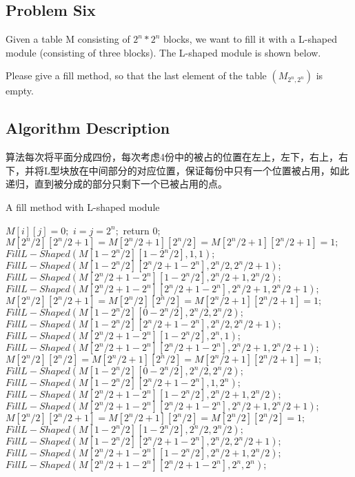 \documentclass{article}
\begin{document}
\begin{CJK*}{UTF8}{gbsn}
\newpage
\section{Problem Six}
Given a table M consisting of $2^n * 2^n$ blocks, we want to fill it with a L-shaped module (consisting of three blocks). The L-shaped module is shown below.

Please give a fill method, so that the last element of the table $(M_{2^n,2^n})$ is empty.

\subsection{Algorithm Description}
算法每次将平面分成四份，每次考虑4份中的被占的位置在左上，左下，右上，右下，并将L型块放在中间部分的对应位置，保证每份中只有一个位置被占用，如此递归，直到被分成的部分只剩下一个已被占用的点。

\begin{algorithm}[htbp]  
  \caption{A fill method with L-shaped module}  
  \begin{algorithmic}[1] 
	\State $M[i][j] = 0;$
	\EndFor
	\EndFor
	\State $i = j = 2^n;$
	\State return 0;
	\EndIf
	\State $M[2^n/2][2^n/2+1]= M[2^n/2+1][2^n/2]= M[2^n/2+1][2^n/2+1] =1;$
	\State $FillL-Shaped(M[1-2^n/2][1-2^n/2], 1, 1);$
	\State $FillL-Shaped(M[1-2^n/2][2^n/2+1-2^n], 2^n/2, 2^n/2+1);$
	\State $FillL-Shaped(M[2^n/2+1-2^n][1-2^n/2], 2^n/2+1, 2^n/2);$
	\State $FillL-Shaped(M[2^n/2+1-2^n][2^n/2+1-2^n], 2^n/2+1, 2^n/2+1);$
	\EndIf
	\State $M[2^n/2][2^n/2+1]= M[2^n/2][2^n/2]= M[2^n/2+1][2^n/2+1] =1;$
	\State $FillL-Shaped(M[1-2^n/2][0-2^n/2], 2^n/2, 2^n/2);$
	\State $FillL-Shaped(M[1-2^n/2][2^n/2+1-2^n], 2^n/2, 2^n/2+1);$
	\State $FillL-Shaped(M[2^n/2+1-2^n][1-2^n/2], 2^n, 1);$
	\State $FillL-Shaped(M[2^n/2+1-2^n][2^n/2+1-2^n], 2^n/2+1, 2^n/2+1);$
	\EndIf
	\State $M[2^n/2][2^n/2]= M[2^n/2+1][2^n/2]= M[2^n/2+1][2^n/2+1] =1;$
	\State $FillL-Shaped(M[1-2^n/2][0-2^n/2], 2^n/2, 2^n/2);$
	\State $FillL-Shaped(M[1-2^n/2][2^n/2+1-2^n], 1, 2^n);$
	\State $FillL-Shaped(M[2^n/2+1-2^n][1-2^n/2], 2^n/2+1, 2^n/2);$
	\State $FillL-Shaped(M[2^n/2+1-2^n][2^n/2+1-2^n], 2^n/2+1, 2^n/2+1);$
	\EndIf
	\State $M[2^n/2][2^n/2+1]= M[2^n/2+1][2^n/2]= M[2^n/2][2^n/2] =1;$
	\State $FillL-Shaped(M[1-2^n/2][1-2^n/2], 2^n/2, 2^n/2);$
	\State $FillL-Shaped(M[1-2^n/2][2^n/2+1-2^n], 2^n/2, 2^n/2+1);$
	\State $FillL-Shaped(M[2^n/2+1-2^n][1-2^n/2], 2^n/2+1, 2^n/2);$
	\State $FillL-Shaped(M[2^n/2+1-2^n][2^n/2+1-2^n], 2^n, 2^n);$
	\EndIf
    \EndFunction  
  \end{algorithmic}  
\end{algorithm} 


\end{CJK*}
\end{document}
